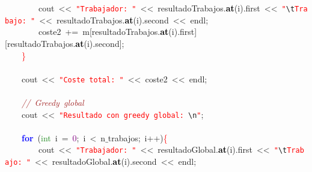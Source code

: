 \mbox{}\ \ \ \ \ \ \ \ cout\ \textcolor{BrickRed}{\textless{}\textless{}}\ \texttt{\textcolor{Red}{"{}Trabajador:\ "{}}}\ \textcolor{BrickRed}{\textless{}\textless{}}\ resultadoTrabajos\textcolor{BrickRed}{.}\textbf{\textcolor{Black}{at}}\textcolor{BrickRed}{(}i\textcolor{BrickRed}{).}first\ \textcolor{BrickRed}{\textless{}\textless{}}\ \texttt{\textcolor{Red}{"{}}}\texttt{\textcolor{CarnationPink}{\textbackslash{}t}}\texttt{\textcolor{Red}{Trabajo:\ "{}}}\ \textcolor{BrickRed}{\textless{}\textless{}}\ resultadoTrabajos\textcolor{BrickRed}{.}\textbf{\textcolor{Black}{at}}\textcolor{BrickRed}{(}i\textcolor{BrickRed}{).}second\ \textcolor{BrickRed}{\textless{}\textless{}}\ endl\textcolor{BrickRed}{;}\  \\
\mbox{}\ \ \ \ \ \ \ \ coste2\ \textcolor{BrickRed}{+=}\ m\textcolor{BrickRed}{[}resultadoTrabajos\textcolor{BrickRed}{.}\textbf{\textcolor{Black}{at}}\textcolor{BrickRed}{(}i\textcolor{BrickRed}{).}first\textcolor{BrickRed}{][}resultadoTrabajos\textcolor{BrickRed}{.}\textbf{\textcolor{Black}{at}}\textcolor{BrickRed}{(}i\textcolor{BrickRed}{).}second\textcolor{BrickRed}{];}\  \\
\mbox{}\ \ \ \ \textcolor{Red}{\}} \\
\mbox{} \\
\mbox{}\ \ \ \ cout\ \textcolor{BrickRed}{\textless{}\textless{}}\ \texttt{\textcolor{Red}{"{}Coste\ total:\ "{}}}\ \textcolor{BrickRed}{\textless{}\textless{}}\ coste2\ \textcolor{BrickRed}{\textless{}\textless{}}\ endl\textcolor{BrickRed}{;} \\
\mbox{} \\
\mbox{}\ \ \ \ \textit{\textcolor{Brown}{//\ Greedy\ global}} \\
\mbox{}\ \ \ \ cout\ \textcolor{BrickRed}{\textless{}\textless{}}\ \texttt{\textcolor{Red}{"{}Resultado\ con\ greedy\ global:\ }}\texttt{\textcolor{CarnationPink}{\textbackslash{}n}}\texttt{\textcolor{Red}{"{}}}\textcolor{BrickRed}{;}\  \\
\mbox{} \\
\mbox{}\ \ \ \ \textbf{\textcolor{Blue}{for}}\ \textcolor{BrickRed}{(}\textcolor{ForestGreen}{int}\ i\ \textcolor{BrickRed}{=}\ \textcolor{Purple}{0}\textcolor{BrickRed}{;}\ i\ \textcolor{BrickRed}{\textless{}}\ n$\_$trabajos\textcolor{BrickRed}{;}\ i\textcolor{BrickRed}{++)}\textcolor{Red}{\{} \\
\mbox{}\ \ \ \ \ \ \ \ cout\ \textcolor{BrickRed}{\textless{}\textless{}}\ \texttt{\textcolor{Red}{"{}Trabajador:\ "{}}}\ \textcolor{BrickRed}{\textless{}\textless{}}\ resultadoGlobal\textcolor{BrickRed}{.}\textbf{\textcolor{Black}{at}}\textcolor{BrickRed}{(}i\textcolor{BrickRed}{).}first\ \textcolor{BrickRed}{\textless{}\textless{}}\ \texttt{\textcolor{Red}{"{}}}\texttt{\textcolor{CarnationPink}{\textbackslash{}t}}\texttt{\textcolor{Red}{Trabajo:\ "{}}}\ \textcolor{BrickRed}{\textless{}\textless{}}\ resultadoGlobal\textcolor{BrickRed}{.}\textbf{\textcolor{Black}{at}}\textcolor{BrickRed}{(}i\textcolor{BrickRed}{).}second\ \textcolor{BrickRed}{\textless{}\textless{}}\ endl\textcolor{BrickRed}{;}\  \\
